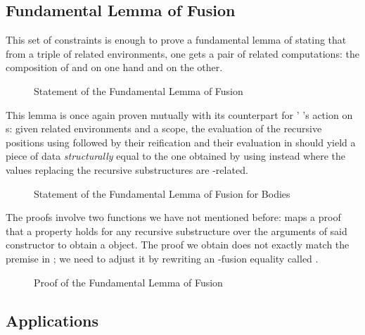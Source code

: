 
\subsection{Fundamental Lemma of Fusion}

This set of constraints is enough to prove a fundamental lemma
of  stating that from a triple of related environments,
one gets a pair of related computations: the composition of 
and  on one hand and  on the other.

\begin{figure}[h]
\caption{Statement of the Fundamental Lemma of Fusion\label{fig:fusiontype}}
\end{figure}

This lemma is once again proven mutually with its counterpart for '
's action on s: given related environments and a scope, the
evaluation of the recursive positions using  followed by their reification
and their evaluation in  should yield a piece of data \emph{structurally}
equal to the one obtained by using  instead where the values replacing
the recursive substructures are -related.

\begin{figure}[h]
\caption{Statement of the Fundamental Lemma of Fusion for Bodies\label{fig:fusionbodytype}}
\end{figure}

The proofs involve two functions we have not mentioned before:
 maps a proof that a property holds for any recursive substructure
over the arguments of said constructor to obtain a  object. The proof
we obtain does not exactly match the premise in ; we need to
adjust it by rewriting an -fusion equality called .

\begin{figure}[h]
\caption{Proof of the Fundamental Lemma of Fusion}
\end{figure}

\subsection{Applications}

